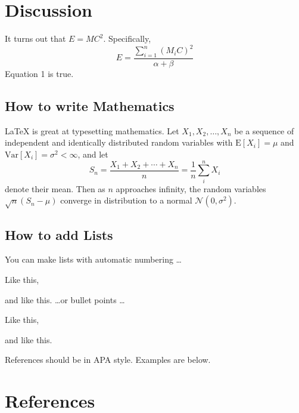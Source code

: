 \documentclass[twocolumn]{article}
\let\tempone\itemize
\let\temptwo\enditemize
\let\tempthree\enumerate
\let\tempfour\endenumerate
\renewenvironment{itemize}{\tempone\setlength{\itemsep}{0pt}}{\temptwo}
\renewenvironment{enumerate}{\tempthree\setlength{\itemsep}{0pt}}{\tempfour}
\begin{document}
\section{Discussion}

It turns out that $E = MC^2$.  Specifically,
\begin{equation}
E = \frac { \sum_{i=1}^n ( M_i C )^2 }{ \alpha + \beta }
\end{equation}
Equation 1 is true.

\subsection{How to write Mathematics}

\LaTeX{} is great at typesetting mathematics. Let $X_1, X_2, \ldots,
X_n$ be a sequence of independent and identically distributed random
variables with $\text{E}[X_i] = \mu$ and $\text{Var}[X_i] = \sigma^2 <
\infty$, and let
\[S_n = \frac{X_1 + X_2 + \cdots + X_n}{n}
      = \frac{1}{n}\sum_{i}^{n} X_i\]
denote their mean. Then as $n$ approaches infinity, the random
variables $\sqrt{n}(S_n - \mu)$ converge in distribution to a normal
$\mathcal{N}(0, \sigma^2)$.

\subsection{How to add Lists}

You can make lists with automatic numbering \dots

\begin{enumerate}
\item Like this,
\item and like this.
\end{enumerate}
\dots or bullet points \dots
\begin{itemize}
\item Like this,
\item and like this.
\end{itemize}

References should be in APA style. Examples are below.

\section*{References}
\end{document}
